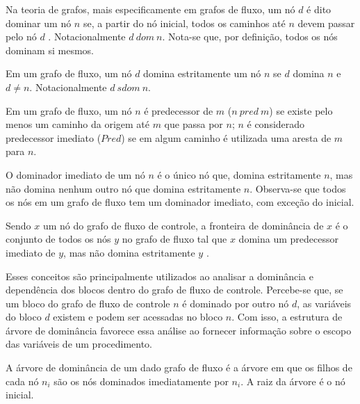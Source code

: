 \begin{definition}[Dominação]\label{def:domination}
Na teoria de grafos, mais especificamente em grafos de fluxo, um nó $d$ é dito dominar um nó $n$ se, a partir do nó inicial, todos os caminhos até $n$ devem passar pelo nó $d$ \cite{muchnick1997advanced}. Notacionalmente $d \
dom \ n$. Nota-se que, por definição, todos os nós dominam si mesmos.
\end{definition}

\begin{definition}
Em um grafo de fluxo, um nó $d$ domina estritamente um nó $n$ se $d$ domina $n$ e $d \neq n$. Notacionalmente $d \ sdom \ n$.
\end{definition}

\begin{definition}
Em um grafo de fluxo, um nó $n$ é predecessor de $m$ ($n \ pred \ m$) se existe pelo menos um caminho da origem até $m$ que passa por $n$; $n$ é considerado predecessor imediato ($Pred$) se em algum caminho é utilizada uma aresta de $m$ para $n$.
\end{definition}

\begin{definition}
O dominador imediato de um nó $n$ é o único nó que, domina estritamente $n$, mas não domina nenhum outro nó que domina estritamente $n$. Observa-se que todos os nós em um grafo de fluxo tem um dominador imediato, com exceção do inicial.
\end{definition}

\begin{definition}\label{def:dominance-frontier}
Sendo $x$ um nó do grafo de fluxo de controle, a fronteira de dominância de $x$ é o conjunto de todos os nós $y$ no grafo de fluxo tal que $x$ domina um predecessor imediato de $y$, mas não domina estritamente $y$ \cite{cytron1991efficiently}.
\end{definition}

Esses conceitos são principalmente utilizados ao analisar a dominância e dependência dos blocos dentro do grafo de fluxo de controle. Percebe-se que, se um bloco do grafo de fluxo de controle $n$ é dominado por outro nó $d$, as variáveis do bloco $d$ existem e podem ser acessadas no bloco $n$. Com isso, a estrutura de árvore de dominância favorece essa análise ao fornecer informação sobre o escopo das variáveis de um procedimento.

\begin{definition}\label{def:dom-tree}
A árvore de dominância de um dado grafo de fluxo é a árvore em que os filhos de cada nó $n_i$ são os nós dominados imediatamente por $n_i$. A raiz da árvore é o nó inicial.
\end{definition}

